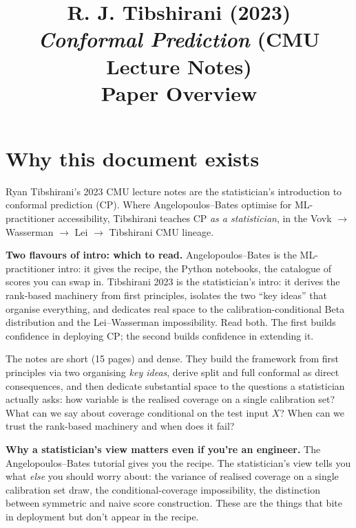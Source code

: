 \documentclass[letterpaper,11pt,leqno]{article}
\title{R. J. Tibshirani (2023)\\\textit{Conformal Prediction} (CMU Lecture Notes)\\[2pt]\large Paper Overview}
\author{}
\date{}
\begin{document}
\maketitle

\section{Why this document exists}\label{s:intro}

Ryan Tibshirani's 2023 CMU lecture notes \cite{tibshirani2023cp} are the statistician's introduction to conformal prediction (CP). Where Angelopoulos--Bates \cite{angelopoulos2022gentle} optimise for ML-practitioner accessibility, Tibshirani teaches CP \emph{as a statistician}, in the Vovk \cite{vovk2005algorithmic} $\to$ Wasserman $\to$ Lei $\to$ Tibshirani CMU lineage.

\begin{keyinsight}
\textbf{Two flavours of intro: which to read.} Angelopoulos--Bates is the ML-practitioner intro: it gives the recipe, the Python notebooks, the catalogue of scores you can swap in. Tibshirani 2023 is the statistician's intro: it derives the rank-based machinery from first principles, isolates the two ``key ideas'' that organise everything, and dedicates real space to the calibration-conditional Beta distribution and the Lei--Wasserman impossibility. Read both. The first builds confidence in deploying CP; the second builds confidence in extending it.
\end{keyinsight}

The notes are short (15 pages) and dense. They build the framework from first principles via two organising \emph{key ideas}, derive split and full conformal as direct consequences, and then dedicate substantial space to the questions a statistician actually asks: how variable is the realised coverage on a single calibration set? What can we say about coverage conditional on the test input $X$? When can we trust the rank-based machinery and when does it fail?

\begin{explain}
\textbf{Why a statistician's view matters even if you're an engineer.} The Angelopoulos--Bates tutorial gives you the recipe. The statistician's view tells you what \emph{else} you should worry about: the variance of realised coverage on a single calibration set draw, the conditional-coverage impossibility, the distinction between symmetric and naive score construction. These are the things that bite in deployment but don't appear in the recipe.
\end{explain}
\end{document}
